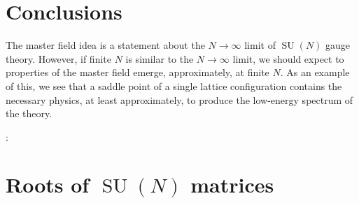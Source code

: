 \documentclass[preprint,aps,prd]{revtex4-2}
\DeclareMathOperator{\SU}{SU}
\begin{document}
\section{Conclusions}

The master field idea is a statement about the $N\to \infty$ limit
of $\SU(N)$ gauge theory.  However, if finite $N$ is similar
to the $N\to\infty$ limit, we should expect to properties of
the master field emerge, approximately, at finite $N$.
As an example of this, we
see that a saddle point of a single lattice configuration
contains the necessary physics, at least approximately, to produce the
low-energy spectrum of the theory.

\vspace{10mm}
:

\appendix

\section{Roots of $\SU(N)$ matrices}
\label{roots}
\end{document}
